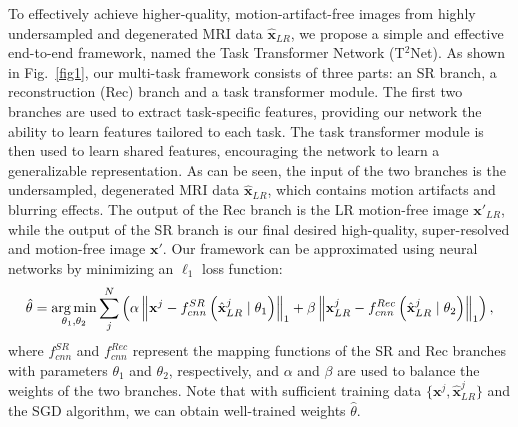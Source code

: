 \documentclass[runningheads]{llncs}
\newcommand{\figref}[1]{Fig.\!~\ref{#1}}
\begin{document}
To effectively achieve higher-quality, motion-artifact-free images from highly undersampled and degenerated MRI data $\hat{ \mathbf{x}}_{LR}$, we propose a simple and effective end-to-end framework, named the Task Transformer Network (T$^2$Net). As shown in \figref{fig1}, our multi-task framework consists of three parts: an SR branch, a reconstruction (Rec) branch and a task transformer module. The first two branches are used to extract task-specific features, providing our network the ability to learn features tailored to each task. The task transformer module is then used to learn shared features, encouraging the network to learn a generalizable representation. As can be seen, the input of the two branches is the undersampled, degenerated MRI data $\hat{\mathbf{x}}_{LR}$, which contains motion artifacts and blurring effects. The output of the Rec branch is the LR motion-free image ${\mathbf{x}'}_{LR}$, while the output of the SR branch is our final desired high-quality, super-resolved and motion-free image $\mathbf{x'}$. Our framework can be approximated using neural networks by minimizing an $\ell_1$ loss function:
\begin{equation}
\small{
\hat{\theta}=\underset{\theta_{1},\theta_{2}}{\arg \min } \sum_{j}^{N}\left(\alpha\left\|\mathbf{x}^{j}-f_{c n n}^{SR}\left(\hat{ \mathbf{x}}^{j}_{LR} \mid \theta_{1}\right)\right\|_{1}+\beta\left\|\mathbf{x}_{LR}^{j}-f_{c n n}^{Rec}\left(\hat{ \mathbf{x}}^{j}_{LR} \mid \theta_{2}\right)\right\|_{1}\right),
}
\end{equation}
where $f_{c n n}^{SR}$ and $f_{c n n}^{Rec}$ represent the mapping functions of the SR and Rec branches with parameters $\theta_{1}$ and $\theta_{2}$, respectively, and $\alpha$ and $\beta$ are used to balance the weights of the two branches. Note that with sufficient training data
$\{\mathbf{x}^{j}, \hat{ \mathbf{x}}^{j}_{LR}\}$
and the SGD algorithm, we can obtain well-trained weights $\hat{\theta}$.
\end{document}
